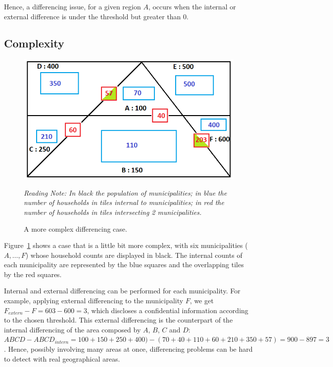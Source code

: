 Hence, a differencing issue, for a given region $A$, occurs when the internal or external difference is under the threshold but greater than $0$.

\subsection{Complexity}

\begin{figure}[H]
    \centering
    \includegraphics[width=0.8\linewidth]{figures/Differencing_issues/schema_intermediaire.png}
    \caption{A more complex differencing case.}
    \vspace{0.1cm}
    \raggedright \textit{Reading Note: In black the population of municipalities; in blue the number of households in tiles internal to municipalities; in red the number of households in tiles intersecting 2 municipalities.}
    \label{fig:schema_inter}
\end{figure}

Figure~\ref{fig:schema_inter} shows a case that is a little bit more complex, with six municipalities ($A, \dots , F$) whose household counts are displayed in black. The internal counts of each municipality are represented by the blue squares and the overlapping tiles by the red squares. 

Internal and external differencing can be performed for each municipality. For example, applying external differencing to the municipality $F$, we get $F_{extern} - F = 603 - 600 = 3$, which discloses a confidential information according to the chosen threshold. This external differencing is the counterpart of the internal differencing of the area composed by $A$, $B$, $C$ and $D$: $ABCD - ABCD_{intern} = 100 + 150 + 250 + 400) - (70 + 40 + 110 + 60 + 210 + 350 + 57) = 900 - 897 = 3$. Hence, possibly involving many areas at once, differencing problems can be hard to detect with real geographical areas.


